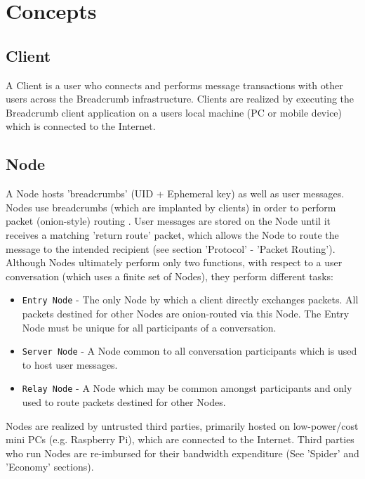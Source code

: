 \documentclass{article}
\begin{document}
\newpage

\section{Concepts}
\subsection{Client}
A Client is a user who connects and performs message transactions with other users across the Breadcrumb infrastructure.
Clients are realized by executing the Breadcrumb client application on a users local machine (PC or mobile device) which is connected to the Internet.

\subsection{Node}
A Node hosts 'breadcrumbs' (UID + Ephemeral key) as well as user messages. Nodes use breadcrumbs (which are implanted by clients) in order to perform packet (onion-style) routing \cite{OnionRouting}. User
messages are stored on the Node until it receives a matching 'return route' packet, which allows the Node to route the message to the intended recipient 
(see section 'Protocol' - 'Packet Routing'). Although Nodes ultimately perform only two functions, with respect to a user conversation (which uses a finite set of Nodes), they
perform different tasks:
\begin{itemize}
	\item \texttt{Entry Node} - The only Node by which a client directly exchanges packets. All packets destined for other Nodes are onion-routed via this Node.
The Entry Node must be unique for all participants of a conversation.
	\item \texttt{Server Node} - A Node common to all conversation participants which is used to host user messages.
	\item \texttt{Relay Node} - A Node which may be common amongst participants and only used to route packets destined for other Nodes.
\end{itemize}
Nodes are realized by untrusted third parties, primarily hosted on low-power/cost mini PCs (e.g. Raspberry Pi), which are connected to the Internet. 
Third parties who run Nodes are re-imbursed for their bandwidth expenditure (See 'Spider' and 'Economy' sections).
\end{document}
